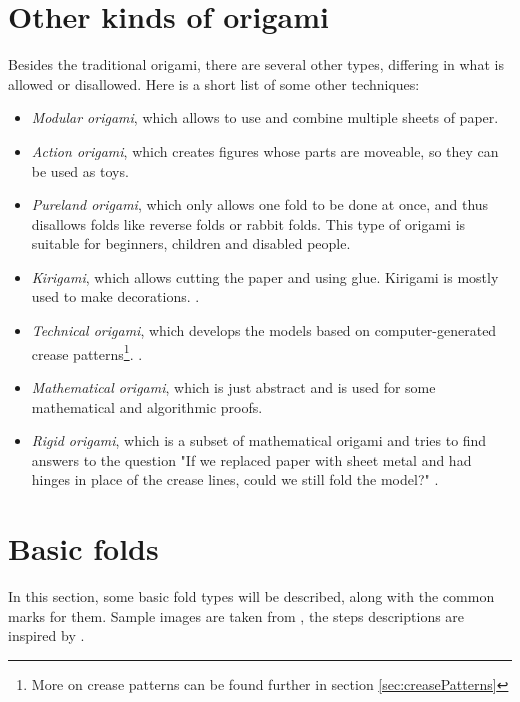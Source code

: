 \section{Other kinds of origami}
Besides the traditional origami, there are several other types, differing in what is allowed or disallowed. Here is a short list of some other techniques:
\begin{itemize}
\item \emph{Modular origami}, which allows to use and combine multiple sheets of paper. \cite{fuse}
\item \emph{Action origami}, which creates figures whose parts are moveable, so they can be used as toys. \cite{lang2}
\item \emph{Pureland origami}, which only allows one fold to be done at once, and thus disallows folds like reverse folds or rabbit folds. This type of origami is suitable for beginners, children and disabled people. \cite{smith}
\item \emph{Kirigami}, which allows cutting the paper and using glue. Kirigami is mostly used to make decorations. \cite{temko2}.
\item \emph{Technical origami}, which develops the models based on computer-generated crease patterns\footnote{More on crease patterns can be found further in section \ref{sec:creasePatterns}}. \cite{mobilereference}.
\item \emph{Mathematical origami}, which is just abstract and is used for some mathematical and algorithmic proofs.
\item \emph{Rigid origami}, which is a subset of mathematical origami and tries to find answers to the question "If we replaced paper with sheet metal and had hinges in place of the crease lines, could we still fold the model?" \cite{mobilereference}.
\end{itemize}

\section{Basic folds}
In this section, some basic fold types will be described, along with the common marks for them. Sample images are taken from \cite{folds}, the steps descriptions are inspired by \cite{lang}.

